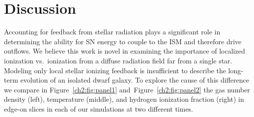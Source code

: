 \section{Discussion} \label{ch2:sec:discussion}
Accounting for feedback from stellar radiation plays a significant role in determining the ability for SN energy to couple to the ISM and therefore drive outflows. We believe this work is novel in examining the
importance of localized ionization vs.\ ionization from a diffuse radiation field far from a single star. Modeling only local stellar ionizing feedback is insufficient to describe the long-term evolution of an isolated dwarf galaxy. To explore the cause of this difference we compare in Figure~\ref{ch2:fig:panel1} and~Figure~\ref{ch2:fig:panel2} the gas number density (left), temperature (middle), and hydrogen ionization fraction (right) in edge-on slices in each of our simulations at two different times.

